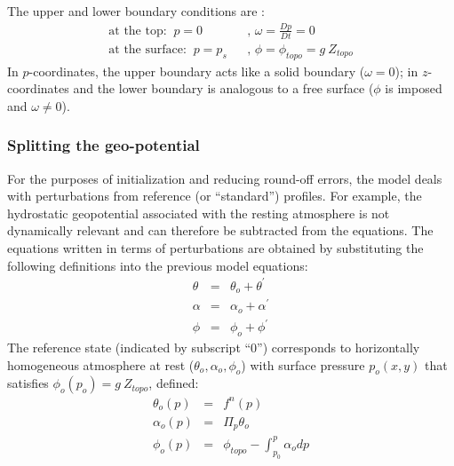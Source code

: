 \documentclass[12pt]{book}
\begin{document}
The upper and lower boundary conditions are : 
\begin{eqnarray}
\mbox{at the top:}\;\;p=0 &&\text{, }\omega =\frac{Dp}{Dt}=0 \\
\mbox{at the surface:}\;\;p=p_{s} &&\text{, }\phi =\phi _{topo}=g~Z_{topo}
\label{eq:boundary-condition-atmosphere}
\end{eqnarray}
In $p$-coordinates, the upper boundary acts like a solid boundary ($\omega
=0 $); in $z$-coordinates and the lower boundary is analogous to a free
surface ($\phi $ is imposed and $\omega \neq 0$).

\subsubsection{Splitting the geo-potential}

For the purposes of initialization and reducing round-off errors, the model
deals with perturbations from reference (or ``standard'') profiles. For
example, the hydrostatic geopotential associated with the resting atmosphere
is not dynamically relevant and can therefore be subtracted from the
equations. The equations written in terms of perturbations are obtained by
substituting the following definitions into the previous model equations: 
\begin{eqnarray}
\theta &=&\theta _{o}+\theta ^{\prime }  \label{eq:atmos-ref-prof-theta} \\
\alpha &=&\alpha _{o}+\alpha ^{\prime }  \label{eq:atmos-ref-prof-alpha} \\
\phi &=&\phi _{o}+\phi ^{\prime }  \label{eq:atmos-ref-prof-phi}
\end{eqnarray}
The reference state (indicated by subscript ``0'') corresponds to
horizontally homogeneous atmosphere at rest ($\theta _{o},\alpha _{o},\phi
_{o}$) with surface pressure $p_{o}(x,y)$ that satisfies $\phi
_{o}(p_{o})=g~Z_{topo}$, defined: 
\begin{eqnarray*}
\theta _{o}(p) &=&f^{n}(p) \\
\alpha _{o}(p) &=&\Pi _{p}\theta _{o} \\
\phi _{o}(p) &=&\phi _{topo}-\int_{p_{0}}^{p}\alpha _{o}dp
\end{eqnarray*}
\end{document}
